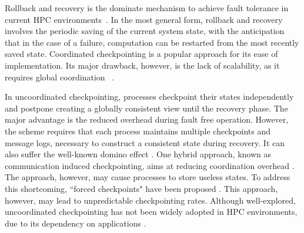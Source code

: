 Rollback and recovery is the dominate mechanism to achieve fault
tolerance in current HPC environments~\cite{Elnozahy:02:Survey}. In the most general form, rollback and recovery 
involves the periodic saving of the current system state, with the anticipation that
in the case of a failure, computation can be restarted from the most recently saved state. %
Coordinated checkpointing is a popular approach for
its ease of implementation.
Its major drawback, however, is the
lack of scalability, as it requires global coordination
~\cite{elnozahy_dsc_2004}.%


In uncoordinated checkpointing, processes checkpoint their states independently and postpone creating a 
globally consistent view until the recovery phase. The major advantage is the reduced overhead during fault free operation. However, the scheme requires that
each process maintains multiple checkpoints and message logs, necessary to construct a consistent 
state during recovery. It can also suffer the well-known domino effect 
 \cite{randell_domino_effect}. One hybrid approach, known as communication induced 
checkpointing, aims at reducing coordination overhead \cite{alvisi_ftc_1999}. The approach, however, may 
cause processes to store useless states. To address this 
shortcoming, ``forced checkpoints" have been proposed \cite{helary_rds_1997}. This approach, however,  may lead to unpredictable
checkpointing rates. Although well-explored, uncoordinated checkpointing has not been widely adopted
in HPC environments, due to its dependency on applications \cite{guermouche_2011_ipdps}.



